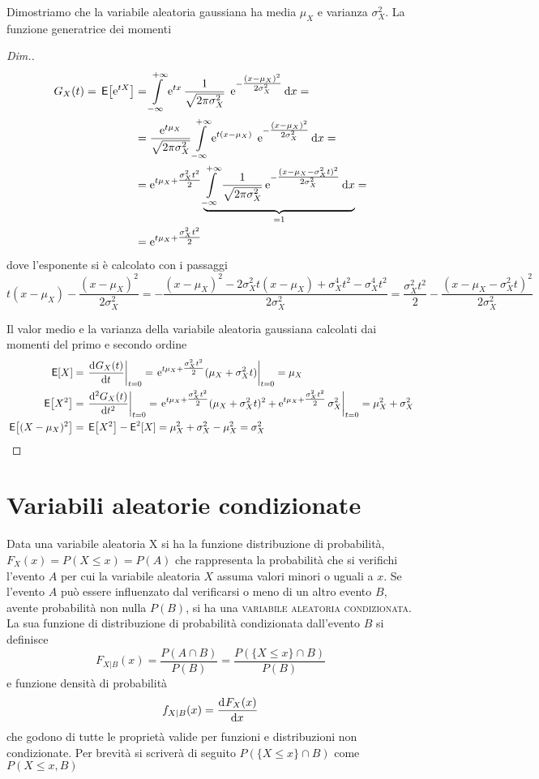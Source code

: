Dimostriamo che la variabile aleatoria gaussiana ha media $\mu_X$ e varianza $\sigma^2_X$. La funzione generatrice dei momenti
\begin{proof}[Dim.]
\[\begin{split}G_X(t)=\,{\operatorname{\mathsf{E}}}\!\left[{\operatorname{e}^{t X}}\right]&=\int\limits_{-\infty}^{+\infty}{\operatorname{e}^{t x}\frac{1}{\sqrt{2\pi\sigma^2_X}}\;\operatorname{e}^{-\tfrac{(x-\mu_X)^2}{2\sigma^2_X}}}{\,\mathop{}\!\mathrm{d}{x}}=\\
&=\frac{\operatorname{e}^{t\mu_X}}{\sqrt{2\pi\sigma^2_X}}\int\limits_{-\infty}^{+\infty}{\operatorname{e}^{t (x-\mu_X)}\;\operatorname{e}^{-\tfrac{(x-\mu_X)^2}{2\sigma^2_X}}}{\,\mathop{}\!\mathrm{d}{x}}=\\
&=\operatorname{e}^{t\mu_X+\tfrac{\sigma^2_X t^2}{2}}\underbrace{\int\limits_{-\infty}^{+\infty}{\frac{1}{\sqrt{2\pi\sigma^2_X}}\operatorname{e}^{-\tfrac{(x-\mu_X-\sigma^2_X t)^2}{2\sigma^2_X}}}{\,\mathop{}\!\mathrm{d}{x}}}_{=1}=\\
&=\operatorname{e}^{t\mu_X+\tfrac{\sigma^2_X t^2}{2}}\end{split}\]
dove l'esponente si è calcolato con i passaggi
\[t(x-\mu_X)-\frac{(x-\mu_X)^2}{2\sigma^2_X}=-\frac{(x-\mu_X)^2-2\sigma^2_X t(x-\mu_X)+\sigma^4_X t^2-\sigma^4_X t^2}{2\sigma^2_X}=\frac{\sigma^2_X t^2}{2}-\frac{(x-\mu_X-\sigma^2_X t)^2}{2\sigma^2_X}\]

Il valor medio e la varianza della variabile aleatoria gaussiana calcolati dai momenti del primo e secondo ordine 
\begin{equation}\begin{split}
\E{X}&=\restrict{\deriv{G_X(t)}{t}}{t=0}=\restrict{\e{t\mu_X+\tfrac{\sigma^2_X t^2}{2}}(\mu_X+\sigma^2_X t)}{t=0}=\mu_X
\\
\E{X^2}&=\restrict{\deriv[2]{G_X(t)}{t}}{t=0}=\restrict{\e{t\mu_X+\tfrac{\sigma^2_X t^2}{2}}(\mu_X+\sigma^2_X t)^2+\e{t\mu_X+\tfrac{\sigma^2_X t^2}{2}}\sigma^2_X}{t=0}=\mu^2_X+\sigma^2_X
\\\E{(X-\mu_X)^2}&=\E{X^2}-\Esp^2[X]=\mu^2_X+\sigma^2_X-\mu^2_X=\sigma^2_X
\end{split}
\end{equation}
\end{proof}

\section{Variabili aleatorie condizionate}
Data una variabile aleatoria X si ha la funzione distribuzione di probabilità, $F_X(x)=P(X\leq x)=P(A)$ che rappresenta la probabilità che si verifichi l'evento $A$ per cui la variabile aleatoria $X$ assuma valori minori o uguali a $x$.
Se l'evento $A$ può essere influenzato dal verificarsi o meno di un altro evento $B$, avente probabilità non nulla $P(B)$, si ha una \textsc{variabile aleatoria condizionata}. 
La sua funzione di distribuzione di probabilità condizionata dall'evento $B$ si definisce
\begin{equation}
F_{X|B}(x)=\frac{P(A\cap B)}{P(B)}=\frac{P(\lbrace X\leq x\rbrace\cap B)}{P(B)}
\end{equation}
e funzione densità di probabilità
\[f_{X|B}(x)=\dfrac{\mathop{}\!\mathrm{d}^{}F_X(x)}{\mathop{}\!\mathrm{d} x^{}}\]
che godono di tutte le proprietà valide per funzioni e distribuzioni non condizionate.
Per brevità si scriverà di seguito $P(\lbrace X\leq x\rbrace\cap B)$ come $P(X\leq x, B)$

